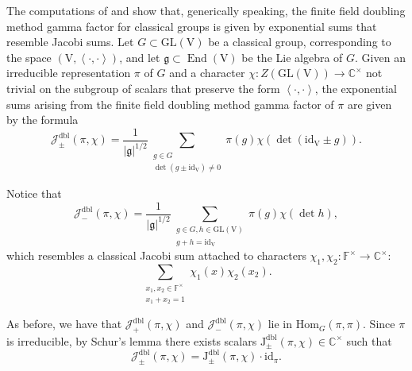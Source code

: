 \documentclass[12pt, reqno]{amsart}
\theoremstyle{definition}
\theoremstyle{definition}
\theoremstyle{definition}
\newcommand{\cComplex}{\mathbb{C}}
\newcommand{\multiplicativegroup}[1]{#1^{\times}}
\newcommand{\Hom}{\mathrm{Hom}}
\newcommand{\EndomorphismRing}{\operatorname{End}}
\newcommand{\idmap}{\mathrm{id}}
\newcommand{\sizeof}[1]{\left|#1\right|}
\newcommand{\hermitianSpace}{\mathrm{V}}
\newcommand{\innerproduct}[2]{\left\langle #1,#2\right\rangle}
\newcommand{\GL}{\mathrm{GL}}
\newcommand{\finiteField}{\mathbb{F}}
\newcommand{\dblJacobiSum}[2]{\mathcal{J}_{\pm}^{\mathrm{dbl}}\left(#1, #2\right)}
\newcommand{\posDblJacobiSum}[2]{\mathcal{J}_{+}^{\mathrm{dbl}}\left(#1, #2\right)}
\newcommand{\negDblJacobiSum}[2]{\mathcal{J}_{-}^{\mathrm{dbl}}\left(#1, #2\right)}
\newcommand{\dblJacobiSumScalar}[2]{\mathrm{J}_{\pm}^{\mathrm{dbl}}\left(#1, #2\right)}
\newcommand{\lieAlgebra}{\mathfrak{g}}
\begin{document}
The computations of \cite{Chang1997} and \cite{GirschZelingher2025} show that, generically speaking, the finite field doubling method gamma factor for classical groups is given by exponential sums that resemble Jacobi sums. Let $G \subset \GL\left(\hermitianSpace\right)$ be a classical group, corresponding to the space $\left(\hermitianSpace, \innerproduct{\cdot}{\cdot}\right)$, and let $\lieAlgebra \subset \EndomorphismRing\left(\hermitianSpace\right)$ be the Lie algebra of $G$. Given an irreducible representation $\pi$ of $G$ and a character $\chi \colon Z\left(\GL\left(\hermitianSpace\right)\right) \to \multiplicativegroup{\cComplex}$ not trivial on the subgroup of scalars that preserve the form $\innerproduct{\cdot}{\cdot}$, the exponential sums arising from the finite field doubling method gamma factor of $\pi$ are given by the formula
$$\dblJacobiSum{\pi}{\chi} = \frac{1}{\sizeof{\lieAlgebra}^{1 \slash 2}} \sum_{\substack{g \in G\\
\det\left(g \pm \idmap_{\hermitianSpace}\right) \ne 0}} \pi\left(g\right) \chi\left(\det\left(\idmap_{\hermitianSpace} \pm g\right)\right).$$

Notice that $$\negDblJacobiSum{\pi}{\chi} = \frac{1}{\sizeof{\lieAlgebra}^{1/2}}\sum_{\substack{g \in G, h \in \GL\left(\hermitianSpace\right)\\
g + h = \idmap_{\hermitianSpace}}} \pi\left(g\right) \chi\left(\det h\right),$$
which resembles a classical Jacobi sum attached to characters $\chi_1, \chi_2 \colon \multiplicativegroup{\finiteField} \to \multiplicativegroup{\cComplex}$:
$$\sum_{\substack{x_1,x_2 \in \multiplicativegroup{\finiteField}\\
		x_1 + x_2 = 1}} \chi_1\left(x\right) \chi_2\left(x_2\right).$$

As before, we have that $\posDblJacobiSum{\pi}{\chi}$ and $\negDblJacobiSum{\pi}{\chi}$ lie in $\Hom_G\left(\pi, \pi\right)$. Since $\pi$ is irreducible, by Schur's lemma there exists scalars $\dblJacobiSumScalar{\pi}{\chi} \in \multiplicativegroup{\cComplex}$ such that $$\dblJacobiSum{\pi}{\chi} = \dblJacobiSumScalar{\pi}{\chi} \cdot \idmap_{\pi}.$$
\end{document}
